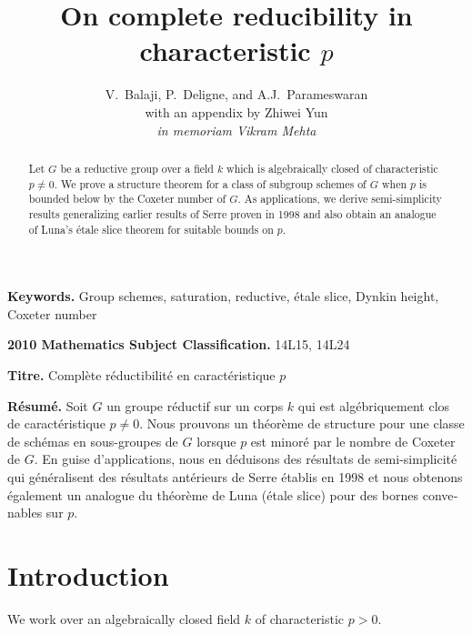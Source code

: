 \documentclass[11pt,a4paper]{article}
\title{On complete reducibility in characteristic $p$}
\author{V.~Balaji, P.~Deligne, and A.J.~Parameswaran\\with an appendix by Zhiwei Yun\\[1ex]\textit{in memoriam Vikram Mehta}}
\date{}
\theoremstyle{plain}
\theoremstyle{definition}
\begin{document}
\maketitle

\begin{abstract}
Let $G$ be a reductive group over a field $k$ which is algebraically closed of characteristic $p \neq 0$. We prove a structure theorem for a class of subgroup schemes of $G$ when $p$ is bounded below by the Coxeter number of $G$. As applications, we derive semi-simplicity results generalizing earlier results of Serre proven in 1998 and also obtain an analogue of Luna's \'etale slice theorem for suitable bounds on $p$.
\end{abstract}

\noindent\textbf{Keywords.} Group schemes, saturation, reductive, \'etale slice, Dynkin height, Coxeter number

\noindent\textbf{2010 Mathematics Subject Classification.} 14L15, 14L24

\begin{otherlanguage}{french}
\noindent\textbf{Titre.} Compl\`ete r\'eductibilit\'e en caract\'eristique $p$

\noindent\textbf{R\'esum\'e.} Soit $G$ un groupe r\'eductif sur un corps $k$ qui est alg\'ebriquement clos de caract\'eristique $p \neq 0$. Nous prouvons un th\'eor\`eme de structure pour une classe de sch\'emas en sous-groupes de $G$ lorsque $p$ est minor\'e par le nombre de Coxeter de $G$. En guise d'applications, nous en d\'eduisons des r\'esultats de semi-simplicit\'e qui g\'en\'eralisent des r\'esultats ant\'erieurs de Serre \'etablis en 1998 et nous obtenons \'egalement un analogue du th\'eor\`eme de Luna (\'etale slice) pour des bornes convenables sur $p$.
\end{otherlanguage}

\tableofcontents

\section{Introduction}

We work over an algebraically closed field $k$ of characteristic $p > 0$.
\end{document}
